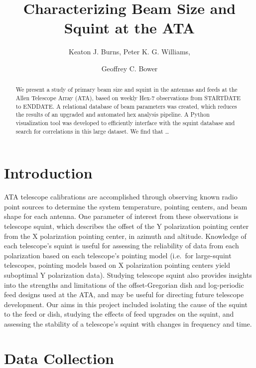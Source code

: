 \documentclass[preprint]{aastex}
\begin{document}
\title{Characterizing Beam Size and Squint at the ATA}
\author{Keaton J. Burns, Peter K. G. Williams, \and Geoffrey C. Bower}

\begin{abstract}
We present a study of primary beam size and squint in the antennas and
feeds at the Allen Telescope Array (ATA), based on weekly Hex-7
observations from STARTDATE to ENDDATE.  A relational database of beam
parameters was created, which reduces the results of an upgraded and
automated hex analysis pipeline.  A Python visualization tool was
developed to efficiently interface with the squint database and search
for correlations in this large dataset.  We find that \ldots
\end{abstract}


\section{Introduction}\label{s.intro}
ATA telescope calibrations are accomplished through observing known
radio point sources to determine the system temperature, pointing
centers, and beam shape for each antenna.  One parameter of interest
from these observations is telescope squint, which describes the
offset of the Y polarization pointing center from the X polarization
pointing center, in azimuth and altitude.  Knowledge of each
telescope's squint is useful for assessing the reliability of data
from each polarization based on each telescope's pointing model
(i.e.~for large-squint telescopes, pointing models based on X
polarization pointing centers yield suboptimal Y polarization
data). Studying telescope squint also provides insights into the
strengths and limitations of the offset-Gregorian dish and
log-periodic feed designs used at the ATA, and may be useful for
directing future telescope development.  Our aims in this project
included isolating the cause of the squint to the feed or dish,
studying the effects of feed upgrades on the squint, and assessing the
stability of a telescope's squint with changes in frequency and time.


\section{Data Collection}\label{s.datacollection}
\end{document}
